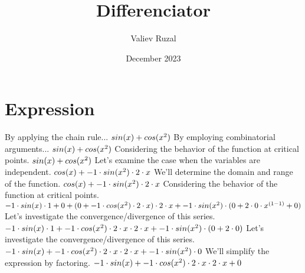 \documentclass[a4paper, 12pt]{article}
\title{ Differenciator }
\author{Valiev Ruzal}
\date{December 2023}
\begin{document}
\maketitle
\section{Expression}
By applying the chain rule...\newline
$ sin( x )  +  cos(  { x } ^ {\small 2 }  ) $\newline
By employing combinatorial arguments...\newline
$ sin( x )  +  cos(  { x } ^ {\small 2 }  ) $\newline
Considering the behavior of the function at critical points.\newline
$ sin( x )  +  cos(  { x } ^ {\small 2 }  ) $\newline
Let's examine the case when the variables are independent.\newline
$ cos( x )  + -1 \cdot  sin(  { x } ^ {\small 2 }  )  \cdot 2 \cdot x$\newline
We'll determine the domain and range of the function.\newline
$ cos( x )  + -1 \cdot  sin(  { x } ^ {\small 2 }  )  \cdot 2 \cdot x$\newline
Considering the behavior of the function at critical points.\newline
$-1 \cdot  sin( x )  \cdot 1 + 0 +  ( 0 + -1 \cdot  cos(  { x } ^ {\small 2 }  )  \cdot 2 \cdot x )  \cdot 2 \cdot x + -1 \cdot  sin(  { x } ^ {\small 2 }  )  \cdot  ( 0 + 2 \cdot 0 \cdot  { x } ^ {\small  ( 1 - 1 )  }  + 0 ) $\newline
Let's investigate the convergence/divergence of this series.\newline
$-1 \cdot  sin( x )  \cdot 1 + -1 \cdot  cos(  { x } ^ {\small 2 }  )  \cdot 2 \cdot x \cdot 2 \cdot x + -1 \cdot  sin(  { x } ^ {\small 2 }  )  \cdot  ( 0 + 2 \cdot 0 ) $\newline
Let's investigate the convergence/divergence of this series.\newline
$-1 \cdot  sin( x )  + -1 \cdot  cos(  { x } ^ {\small 2 }  )  \cdot 2 \cdot x \cdot 2 \cdot x + -1 \cdot  sin(  { x } ^ {\small 2 }  )  \cdot 0$\newline
We'll simplify the expression by factoring.\newline
$-1 \cdot  sin( x )  + -1 \cdot  cos(  { x } ^ {\small 2 }  )  \cdot 2 \cdot x \cdot 2 \cdot x + 0$\newline
\end{document}
